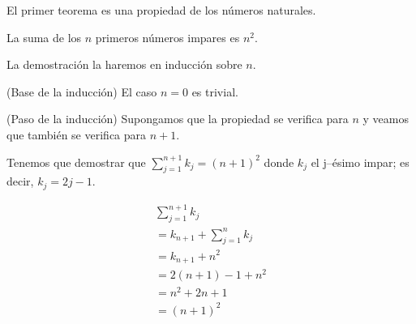 %
\begin{isabellebody}%
%
%
\isadelimtheory
%
\endisadelimtheory
%
\isatagtheory
%
\endisatagtheory
{\isafoldtheory}%
%
\isadelimtheory
%
\endisadelimtheory
%
\isadelimdocument
%
\endisadelimdocument
%
\isatagdocument
%
\isamarkuptrue%
%
\endisatagdocument
{\isafolddocument}%
%
\isadelimdocument
%
\endisadelimdocument
%
\begin{isamarkuptext}%
El primer teorema es una propiedad de los números naturales.

  \begin{teorema}
    La suma de los $n$ primeros números impares es $n^2$.
  \end{teorema}

  \begin{demostracion}
    La demostración la haremos en inducción sobre $n$.
    
    (Base de la inducción) El caso $n = 0$ es trivial.
    
    (Paso de la inducción) Supongamos que la propiedad se verifica para
    $n$ y veamos que también se verifica para $n+1$. 
 
    Tenemos que demostrar que $\sum_{j=1}^{n+1} k_j = (n+1)^2$ donde
    $k_j$ el j--ésimo impar; es decir, $k_j = 2j - 1$.

    $$\begin{array}{l}
      \sum_{j = 1}^{n+1} k_j \\
      = k_{n+1} + \sum^{n}_{j=1} k_j \\ 
      = k_{n+1} + n^2 \\
      = 2(n+1) - 1 + n^2 \\
      = n^2 + 2n + 1 \\ 
      = (n+1)^2
      \end{array}$$ 
  \end{demostracion}


\end{isamarkuptext}
\end{isabellebody}
